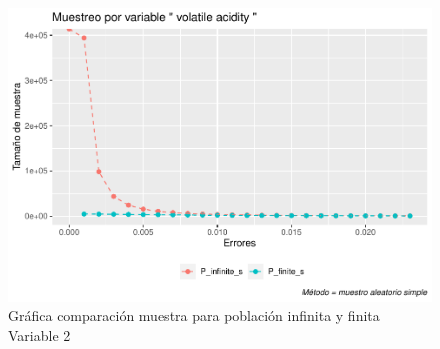 \documentclass[
]{article}
\begin{document}
\begin{figure}
\centering
\includegraphics{1_examen_solucion_files/figure-latex/grafica var2-1.pdf}
\caption{Gráfica comparación muestra para población infinita y finita
Variable 2}
\end{figure}
\end{document}
